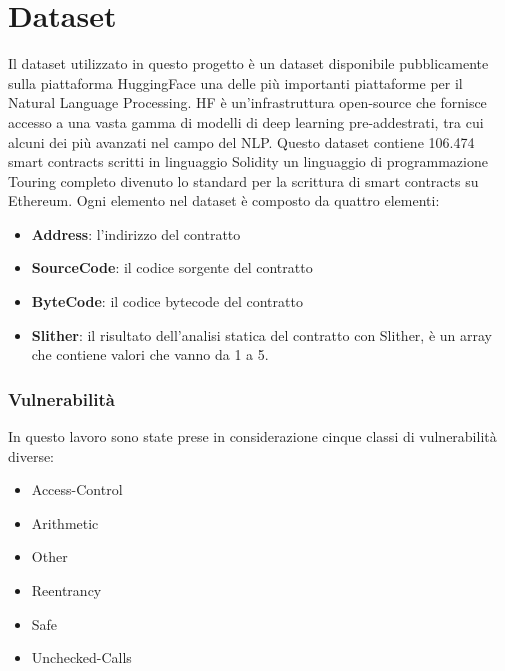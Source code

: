 \documentclass[../../Thesis.tex]{subfiles}
\begin{document}
\chapter{Dataset}
Il dataset \cite{rossini2022slitherauditedcontracts} utilizzato in questo progetto è un dataset disponibile pubblicamente sulla piattaforma HuggingFace una delle più importanti piattaforme per il Natural Language Processing. HF è un'infrastruttura open-source che fornisce accesso a una vasta gamma di modelli di deep learning pre-addestrati, tra cui alcuni dei più avanzati nel campo del NLP.
Questo dataset contiene 106.474 smart contracts scritti in linguaggio Solidity un linguaggio di programmazione Touring completo divenuto lo standard per la scrittura di smart contracts su Ethereum. Ogni elemento nel dataset è composto da quattro elementi:
\begin{itemize}
    \item  \textbf{Address}: l'indirizzo del contratto
    \item  \textbf{SourceCode}: il codice sorgente del contratto
    \item  \textbf{ByteCode}: il codice bytecode del contratto
    \item  \textbf{Slither}: il risultato dell'analisi statica del contratto con Slither, è un array che contiene valori che vanno da 1 a 5. 
\end{itemize}
\subsection{Vulnerabilità}
In questo lavoro sono state prese in considerazione cinque classi di vulnerabilità diverse: 
\begin{itemize}
    \item Access-Control
    \item Arithmetic
    \item Other
    \item Reentrancy
    \item Safe
    \item Unchecked-Calls
\end{itemize}
\end{document}
